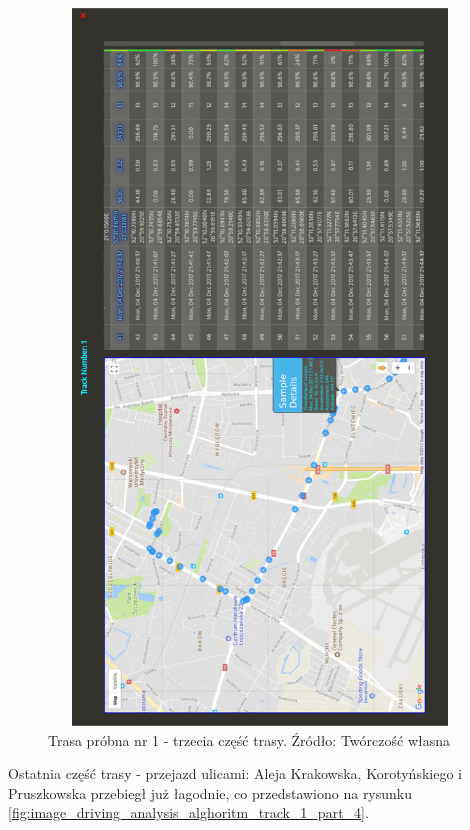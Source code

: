 \begin{figure}[H]
	\centering
	\includegraphics[height=19cm, width=13cm]{img/driving_analysis/test_track_part_3.png}
	\caption{Trasa próbna nr 1 - trzecia część trasy. Źródło: Twórczość własna}
	\label{fig:image_driving_analysis_alghoritm_track_1_part_3}
\end{figure}

Ostatnia część trasy - przejazd ulicami: Aleja Krakowska, Korotyńskiego i Pruszkowska przebiegł już łagodnie, co przedstawiono na rysunku \ref{fig:image_driving_analysis_alghoritm_track_1_part_4}.

